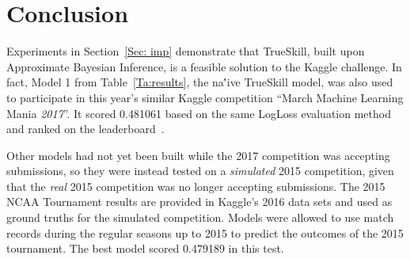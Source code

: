 \chapter{Conclusion}\label{Chap:4}

Experiments in Section~\ref{Sec: imp} demonstrate that TrueSkill, built upon Approximate Bayesian Inference, is a feasible solution to the Kaggle challenge. In fact, Model 1 from Table~\ref{Ta:results}, the na\''{i}ve TrueSkill model, was also used to participate in this year's similar Kaggle competition ``March Machine Learning Mania \emph{2017}''. It scored 0.481061 based on the same LogLoss evaluation method and ranked  on the leaderboard~\cite{KG17}. 

Other models had not yet been built while the 2017 competition was accepting submissions, so they were instead tested on a \emph{simulated} 2015 competition, given that the \emph{real} 2015 competition was no longer accepting submissions. The 2015 NCAA Tournament results are provided in Kaggle's 2016 data sets and used as ground truths for the simulated competition. Models were allowed to use match records during the regular seasons up to 2015 to predict the outcomes of the 2015 tournament. The best model scored 0.479189 in this test. 